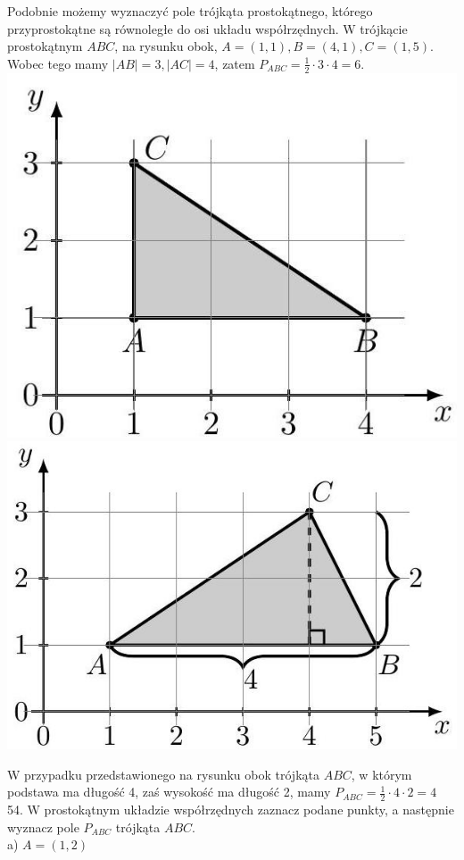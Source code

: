 \documentclass[10pt]{article}
\begin{document}
Podobnie możemy wyznaczyć pole trójkąta prostokątnego, którego przyprostokątne są równoległe do osi układu współrzędnych. W trójkącie prostokątnym \(A B C\), na rysunku obok, \(A=(1,1), B=(4,1), C=(1,5)\). Wobec tego mamy \(|A B|=3,|A C|=4\), zatem \(P_{A B C}=\frac{1}{2} \cdot 3 \cdot 4=6\).\\
\includegraphics[max width=\textwidth, center]{2024_11_21_8f01584889ff06348ae7g-202(2)}\\
\includegraphics[max width=\textwidth, center]{2024_11_21_8f01584889ff06348ae7g-202}

W przypadku przedstawionego na rysunku obok trójkąta \(A B C\), w którym podstawa ma długość 4, zaś wysokość ma długość 2, mamy \(P_{A B C}=\frac{1}{2} \cdot 4 \cdot 2=4\)\\
54. W prostokątnym układzie współrzędnych zaznacz podane punkty, a następnie wyznacz pole \(P_{A B C}\) trójkąta \(A B C\).\\
a) \(A=(1,2)\)
\end{document}
